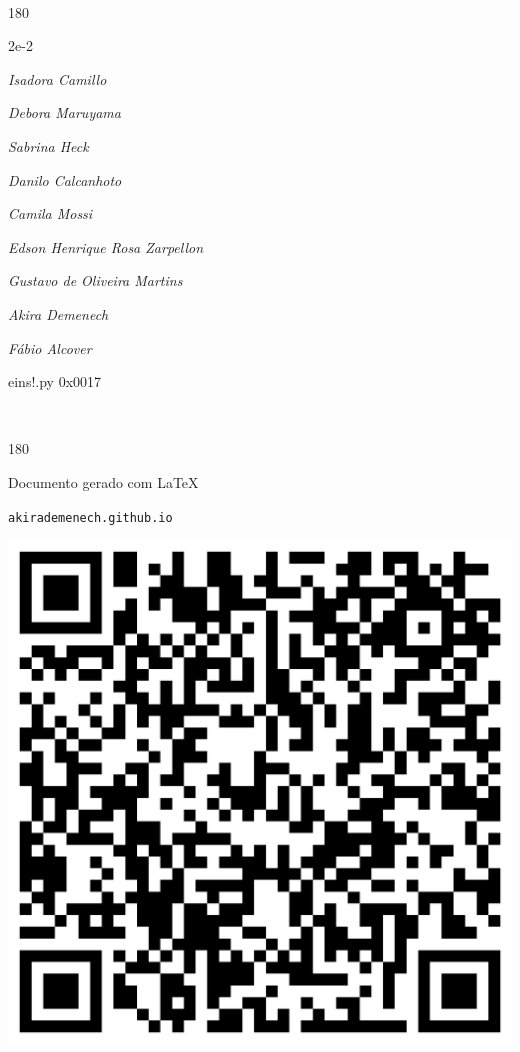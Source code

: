 \documentclass[12pt]{article}
\begin{document}
	\ 
	\vfill
	\begin{turn}{180}	
		\begin{minipage}{\textwidth}
		  	\ttfamily %
			\centering
			{\Huge 2e-2}
		  
			\hfill
		  
			

\textit{\small Isadora Camillo}

\textit{\small Debora Maruyama}

\textit{\small Sabrina Heck}

\textit{\small Danilo Calcanhoto}

\textit{\small Camila Mossi}

\textit{\small Edson Henrique Rosa Zarpellon}

\textit{\small Gustavo de Oliveira Martins}

\textit{\small Akira Demenech}

\textit{\small Fábio Alcover}

\bigskip

eins!.py
0x0017


		\end{minipage}	
	\end{turn}
	\vfill
	\

\pagebreak

	\begin{turn}{180}	
		\begin{minipage}{\textwidth}		  
		  Documento gerado com \LaTeX			
		  
		  \texttt{akirademenech.github.io}

		  \includegraphics[height=0.3\textheight]{2e-2.pdf}

		\end{minipage}	
	\end{turn}  
		  
\end{document}
